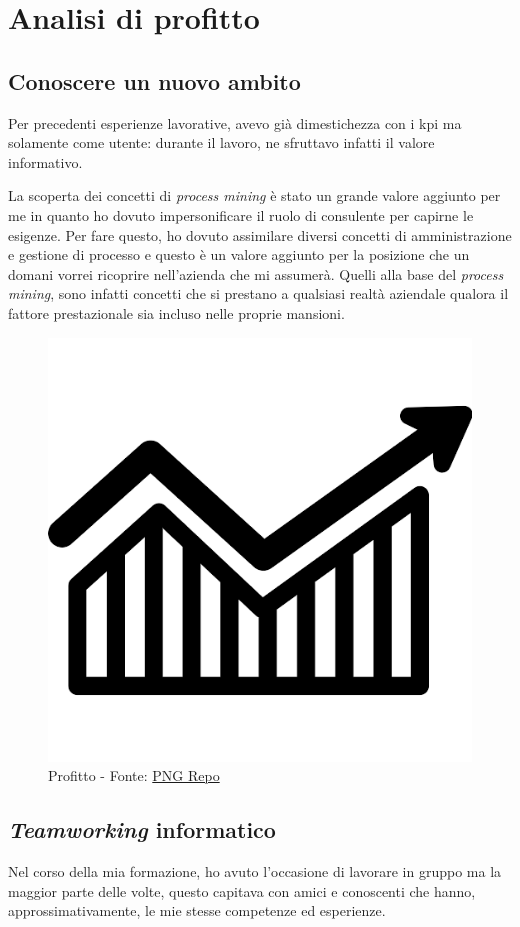 \section{Analisi di profitto}
\subsection{Conoscere un nuovo ambito}
Per precedenti esperienze lavorative, avevo già dimestichezza con i \acrshort{kpi} ma solamente come utente: durante il lavoro, ne sfruttavo infatti il valore informativo.

La scoperta dei concetti di \textit{process mining} è stato un grande valore aggiunto per me in quanto ho dovuto impersonificare il ruolo di consulente per capirne le esigenze. Per fare questo, ho dovuto assimilare diversi concetti di amministrazione e gestione di processo e questo è un valore aggiunto per la posizione che un domani vorrei ricoprire nell'azienda che mi assumerà. Quelli alla base del \textit{process mining}, sono infatti concetti che si prestano a qualsiasi realtà aziendale qualora il fattore prestazionale sia incluso nelle proprie mansioni.
\begin{figure}[H]
    \centering
    \includegraphics[width=0.5\columnwidth]{immagini/stock-earnings-pngrepo-com.png}
    \caption{Profitto  - Fonte: \href{https://www.pngrepo.com/svg/88166/stock-earnings}{PNG Repo}}
    \label{fig:stonks}
\end{figure}
\vspace{45pt}
\subsection{\textit{Teamworking} informatico}
Nel corso della mia formazione, ho avuto l'occasione di lavorare in gruppo ma la maggior parte delle volte, questo capitava con amici e conoscenti che hanno, approssimativamente, le mie stesse competenze ed esperienze.
